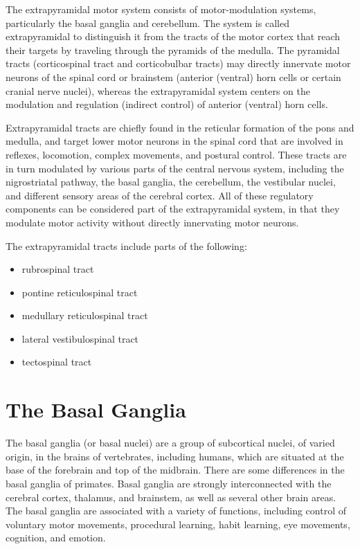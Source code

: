 The extrapyramidal motor system consists of motor-modulation systems, particularly the basal ganglia and cerebellum. The system is called extrapyramidal to distinguish it from the tracts of the motor cortex that reach their targets by traveling through the pyramids of the medulla. The pyramidal tracts (corticospinal tract and corticobulbar tracts) may directly innervate motor neurons of the spinal cord or brainstem (anterior (ventral) horn cells or certain cranial nerve nuclei), whereas the extrapyramidal system centers on the modulation and regulation (indirect control) of anterior (ventral) horn cells.

Extrapyramidal tracts are chiefly found in the reticular formation of the pons and medulla, and target lower motor neurons in the spinal cord that are involved in reflexes, locomotion, complex movements, and postural control. These tracts are in turn modulated by various parts of the central nervous system, including the nigrostriatal pathway, the basal ganglia, the cerebellum, the vestibular nuclei, and different sensory areas of the cerebral cortex. All of these regulatory components can be considered part of the extrapyramidal system, in that they modulate motor activity without directly innervating motor neurons.

The extrapyramidal tracts include parts of the following:

\begin{itemize}
\tightlist
\item
  rubrospinal tract
\item
  pontine reticulospinal tract
\item
  medullary reticulospinal tract
\item
  lateral vestibulospinal tract
\item
  tectospinal tract
\end{itemize}

\hypertarget{the-basal-ganglia-1}{%
\section{The Basal Ganglia}\label{the-basal-ganglia-1}}

The basal ganglia (or basal nuclei) are a group of subcortical nuclei, of varied origin, in the brains of vertebrates, including humans, which are situated at the base of the forebrain and top of the midbrain. There are some differences in the basal ganglia of primates. Basal ganglia are strongly interconnected with the cerebral cortex, thalamus, and brainstem, as well as several other brain areas. The basal ganglia are associated with a variety of functions, including control of voluntary motor movements, procedural learning, habit learning, eye movements, cognition, and emotion.

